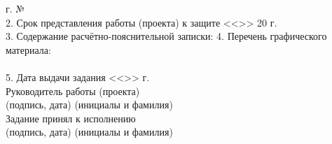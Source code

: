 \begin{titlepage}
\begin{flushleft}
            \the\year г. № \underline{\hspace{3.6cm}}\\
        2. Срок представления работы (проекта) к защите 
            <<\underline{\hspace{1cm}}>> \underline{\hspace{2.8cm}} 20\underline{\hspace{0.5cm}} г.\\
        3. Содержание расчётно-пояснительной записки: \underline{\hspace{12.3em}}
        \underline{\hspace{\textwidth}}
        4. Перечень графического материала: \underline{\hspace{8.7cm}}\\
        \underline{\hspace{\textwidth}}\\
        5. Дата выдачи задания <<\underline{\hspace{1cm}}>> \underline{\hspace{4cm}} \the\year г.\\
        Руководитель работы (проекта) \underline{\hspace{5cm}}
            \hspace{0.5cm} \underline{\hspace{4.2cm}}\\
            \vspace{-0.2cm}\hspace{8cm}\footnotesize(подпись, дата)
            \hspace{3cm}(инициалы и фамилия)\normalsize\\
        Задание принял к исполнению \hspace{0.2cm}\underline{\hspace{5cm}}
            \hspace{0.5cm} \underline{\hspace{4.2cm}}\\
            \vspace{-0.2cm}\hspace{8cm}\footnotesize(подпись, дата)
            \hspace{3cm}(инициалы и фамилия)\normalsize\\
    \end{flushleft}
\end{titlepage}
\setcounter{page}{3}